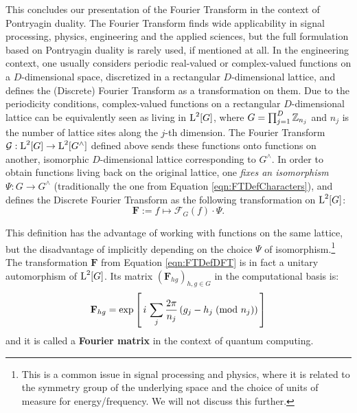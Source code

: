 This concludes our presentation of the Fourier Transform in the context of Pontryagin duality. The Fourier Transform finds wide applicability in signal processing, physics, engineering and the applied sciences, but the full formulation based on Pontryagin duality is rarely used, if mentioned at all. In the engineering context, one usually considers periodic real-valued or complex-valued functions on a $D$-dimensional space, discretized in a rectangular $D$-dimensional lattice, and defines the (Discrete) Fourier Transform as a transformation on them. Due to the periodicity conditions, complex-valued functions on a rectangular $D$-dimensional lattice can be equivalently seen as living in $\operatorname{L}^2[G]$, where $G = \prod_{j=1}^D \mathbb{Z}_{n_j}$ and $n_j$ is the number of lattice sites along the $j$-th dimension. The  Fourier Transform $\mathcal{G} : \operatorname{L}^2[G] \rightarrow \operatorname{L}^2[G^\wedge]$ defined above sends these functions onto functions on another, isomorphic $D$-dimensional lattice corresponding to $G^\wedge$. In order to obtain functions living back on the original lattice, one \emph{fixes an isomorphism} $\Psi : G \rightarrow G^\wedge$ (traditionally the one from Equation \ref{eqn:FTDefCharacters}), and defines the Discrete Fourier Transform as the following transformation on $\operatorname{L}^2[G]$:
\begin{equation}\label{eqn:FTDefDFT}
  \mathbf{F} := f \mapsto \mathcal{F}_G(f) \cdot \Psi.
\end{equation}

This definition has the advantage of working with functions on the same lattice, but the disadvantage of implicitly depending on the choice $\Psi$ of isomorphism.\footnote{This is a common issue in signal processing and physics, where it is related to the symmetry group of the underlying space and the choice of units of measure for energy/frequency. We will not discuss this further.} The transformation $\mathbf{F}$ from Equation \ref{eqn:FTDefDFT} is in fact a unitary automorphism of $\operatorname{L}^2[G]$. Its matrix $(\mathbf{F}_{hg})_{h,g \in G}$ in the computational basis is:
\begin{equation} \label{eqn:HadamardMatrixDef}
  \mathbf{F}_{hg} = \exp\left[\, i \, \sum_j \frac{2 \pi}{n_j} \left(\modclass{g_j-h_j}{n_j}\right) \, \right] %
\end{equation}
and it is called a \textbf{Fourier matrix} in the context of quantum computing.

